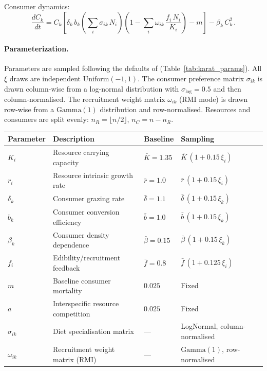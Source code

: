 \documentclass[pdflatex,sn-mathphys-num]{sn-jnl}%
\begin{document}
Consumer dynamics:
\begin{equation}\label{eq:karat_con_rmi}
 \frac{dC_k}{dt}
 = C_k\!\left[
  \delta_k\, b_k\!\left(\sum_{i} \sigma_{ik}\, N_i\right)
  \!\left(1 - \sum_{i} \omega_{ik}\,\frac{f_i\,N_i}{K_i}\right)
 - m
 \right]
 - \beta_k\, C_k^2\,.
\end{equation}

\paragraph{Parameterization.} Parameters are sampled following the defaults of \cite{karatayev_potential_2023} (Table~\ref{tab:karat_params}). All $\xi$ draws are independent $\mathrm{Uniform}(-1,1)$. The consumer preference matrix $\sigma_{ik}$ is drawn column-wise from a log-normal distribution with $\sigma_{\log}=0.5$ and then column-normalised. The recruitment weight matrix $\omega_{ik}$ (RMI mode) is drawn row-wise from a $\mathrm{Gamma}(1)$ distribution and row-normalised. Resources and consumers are split evenly: $n_R = \lfloor n/2 \rfloor$, $n_C = n - n_R$.
\begin{center}
\begin{tabular}{lllll}
\hline
Parameter & Description & Baseline & Sampling \\
\hline
$K_i$   & Resource carrying capacity  & $\bar{K}=1.35$  & $\bar{K}\,(1 + 0.15\,\xi_i)$ \\
$r_i$   & Resource intrinsic growth rate & $\bar{r}=1.0$   & $\bar{r}\,(1 + 0.15\,\xi_i)$ \\
$\delta_k$  & Consumer grazing rate   & $\bar{\delta}=1.1$ & $\bar{\delta}\,(1 + 0.15\,\xi_k)$ \\
$b_k$   & Consumer conversion efficiency & $\bar{b}=1.0$   & $\bar{b}\,(1 + 0.15\,\xi_k)$ \\
$\beta_k$  & Consumer density dependence  & $\bar{\beta}=0.15$ & $\bar{\beta}\,(1 + 0.15\,\xi_k)$ \\
$f_i$   & Edibility/recruitment feedback & $\bar{f}=0.8$   & $\bar{f}\,(1 + 0.125\,\xi_i)$ \\
$m$    & Baseline consumer mortality  & $0.025$    & Fixed \\
$a$    & Interspecific resource competition & $0.025$    & Fixed \\
$\sigma_{ik}$ & Diet specialisation matrix  & —      & LogNormal, column-normalised \\
$\omega_{ik}$ & Recruitment weight matrix (RMI) & —      & $\mathrm{Gamma}(1)$, row-normalised \\
\hline
\end{tabular}
\label{tab:karat_params}
\end{center}
\end{document}
